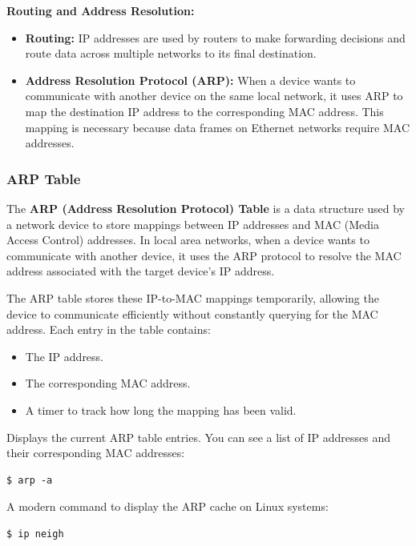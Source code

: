 \documentclass{article}
\newenvironment{codetemplate}[1][]{%
  \mybasecolorbox[#1]
  \itshape
}{%
  \endmybasecolorbox
}
\begin{document}
\textbf{Routing and Address Resolution:}

\begin{itemize}
    \item \textbf{Routing:} IP addresses are used by routers to make forwarding decisions and route data across multiple networks to its final destination.
    \item \textbf{Address Resolution Protocol (ARP):} When a device wants to communicate with another device on the same local network, it uses ARP to map the destination IP address to the corresponding MAC address. This mapping is necessary because data frames on Ethernet networks require MAC addresses.
\end{itemize}

\subsubsection{ARP Table}

The \textbf{ARP (Address Resolution Protocol) Table} is a data structure used by a network device to store mappings between IP addresses and MAC (Media Access Control) addresses. In local area networks, when a device wants to communicate with another device, it uses the ARP protocol to resolve the MAC address associated with the target device's IP address.

The ARP table stores these IP-to-MAC mappings temporarily, allowing the device to communicate efficiently without constantly querying for the MAC address. Each entry in the table contains:
\begin{itemize}
    \item The IP address.
    \item The corresponding MAC address.
    \item A timer to track how long the mapping has been valid.
\end{itemize}

Displays the current ARP table entries. You can see a list of IP addresses and their corresponding MAC addresses:
\begin{codetemplate}{}
\begin{verbatim}
$ arp -a
\end{verbatim}
\end{codetemplate}

A modern command to display the ARP cache on Linux systems:
\begin{codetemplate}{}
\begin{verbatim}
$ ip neigh
\end{verbatim}
\end{codetemplate}
\end{document}
